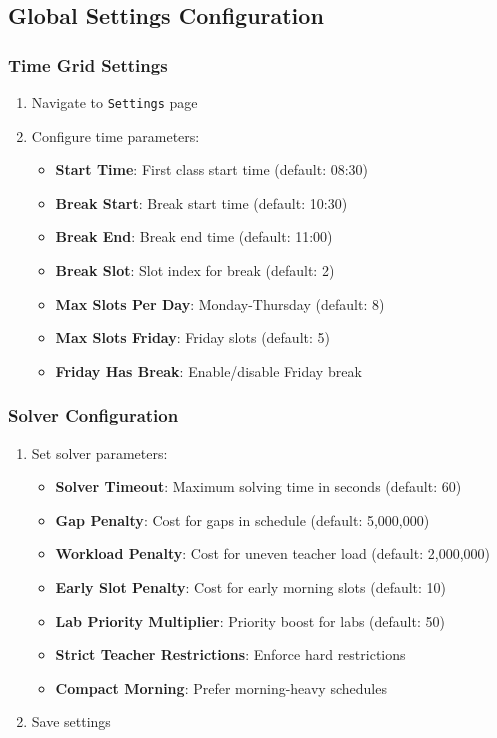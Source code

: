 \documentclass[12pt,a4paper]{article}
\begin{document}
\subsection{Global Settings Configuration}

\subsubsection{Time Grid Settings}
\begin{enumerate}
    \item Navigate to \texttt{Settings} page
    \item Configure time parameters:
    \begin{itemize}
        \item \textbf{Start Time}: First class start time (default: 08:30)
        \item \textbf{Break Start}: Break start time (default: 10:30)
        \item \textbf{Break End}: Break end time (default: 11:00)
        \item \textbf{Break Slot}: Slot index for break (default: 2)
        \item \textbf{Max Slots Per Day}: Monday-Thursday (default: 8)
        \item \textbf{Max Slots Friday}: Friday slots (default: 5)
        \item \textbf{Friday Has Break}: Enable/disable Friday break
    \end{itemize}
\end{enumerate}

\subsubsection{Solver Configuration}
\begin{enumerate}
    \item Set solver parameters:
    \begin{itemize}
        \item \textbf{Solver Timeout}: Maximum solving time in seconds (default: 60)
        \item \textbf{Gap Penalty}: Cost for gaps in schedule (default: 5,000,000)
        \item \textbf{Workload Penalty}: Cost for uneven teacher load (default: 2,000,000)
        \item \textbf{Early Slot Penalty}: Cost for early morning slots (default: 10)
        \item \textbf{Lab Priority Multiplier}: Priority boost for labs (default: 50)
        \item \textbf{Strict Teacher Restrictions}: Enforce hard restrictions
        \item \textbf{Compact Morning}: Prefer morning-heavy schedules
    \end{itemize}
    \item Save settings
\end{enumerate}
\end{document}
